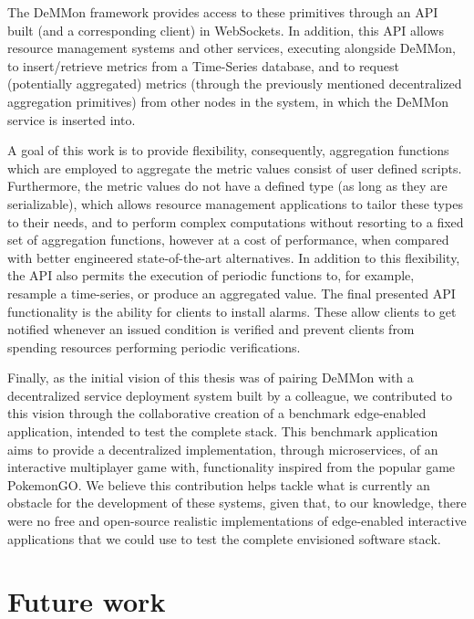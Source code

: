 The DeMMon framework provides access to these primitives through an API built (and a corresponding client) in WebSockets. In addition, this API allows resource management systems and other services, executing alongside DeMMon, to insert/retrieve metrics from a Time-Series database, and to request (potentially aggregated) metrics (through the previously mentioned decentralized aggregation primitives) from other nodes in the system, in which the DeMMon service is inserted into.

A goal of this work is to provide flexibility, consequently, aggregation functions which are employed to aggregate the metric values consist of user defined scripts. Furthermore, the metric values do not have a defined type (as long as they are serializable), which allows resource management applications to tailor these types to their needs, and to perform complex computations without resorting to a fixed set of aggregation functions, however at a cost of performance, when compared with better engineered state-of-the-art alternatives. In addition to this flexibility, the API also permits the execution of periodic functions to, for example, resample a time-series, or produce an aggregated value. The final presented API functionality is the ability for clients to install alarms. These allow clients to get notified whenever an issued condition is verified and prevent clients from spending resources performing periodic verifications. 

Finally, as the initial vision of this thesis was of pairing DeMMon with a decentralized service deployment system built by a colleague, we contributed to this vision through the collaborative creation of a benchmark edge-enabled application, intended to test the complete stack. This benchmark application aims to provide a decentralized implementation, through microservices, of an interactive multiplayer game with, functionality inspired from the popular game PokemonGO. We believe this contribution helps tackle what is currently an obstacle for the development of these systems, given that, to our knowledge, there were no free and open-source realistic implementations of edge-enabled interactive applications that we could use to test the complete envisioned software stack.

\section{Future work}

